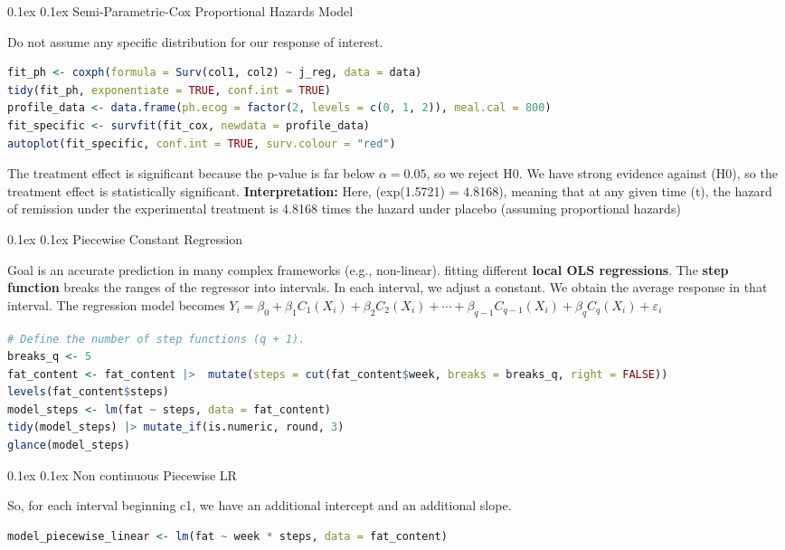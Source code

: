 \documentclass[8pt,landscape]{article}
\makeatletter
\renewcommand{\section}{\@startsection{section}{2}{0pt}%
    {0.1ex}%
    {0.1ex}%
    {\fontsize{8}{9}\bfseries\color{red}}} %
\renewcommand{\subsection}{\@startsection{subsection}{2}{0pt}%
    {0.1ex}%
    {0.1ex}%
    {\fontsize{8}{9}\bfseries\color{blue}}} %
\newcommand{\smalltext}[1]{
  {\fontsize{8}{9}\selectfont\sloppy #1\par}
}
\makeatother
\begin{document}
\begin{multicols}{3}
\subsection{Semi-Parametric-Cox Proportional Hazards Model}
\smalltext{
  Do not assume any specific distribution for our response of interest.
 }
\begin{lstlisting}[language=R]
fit_ph <- coxph(formula = Surv(col1, col2) ~ j_reg, data = data)
tidy(fit_ph, exponentiate = TRUE, conf.int = TRUE)
profile_data <- data.frame(ph.ecog = factor(2, levels = c(0, 1, 2)), meal.cal = 800)
fit_specific <- survfit(fit_cox, newdata = profile_data)
autoplot(fit_specific, conf.int = TRUE, surv.colour = "red")
\end{lstlisting}
\smalltext{
The treatment effect is significant because the p-value is far below $\alpha= 0.05$, so we reject H0.
We have strong evidence against (H0), so the treatment effect is statistically significant.
\textbf{Interpretation:} Here, (exp(1.5721) = 4.8168), meaning that at any given time (t), the hazard of remission under the experimental treatment is 4.8168 times
the hazard under placebo (assuming proportional hazards)
}

\section{Piecewise Constant Regression}
\smalltext{
  Goal is an accurate prediction in many complex frameworks (e.g., non-linear). fitting different \textbf{local OLS regressions}. The \textbf{step function}  
   breaks the ranges of the regressor into intervals. In each interval, we adjust a constant. We obtain the average response in that interval. The regression model becomes
   $Y_i = \beta_0 + \beta_1 C_1(X_i) + \beta_2 C_2(X_i) + \cdots + \beta_{q-1} C_{q-1}(X_i) + \beta_q C_q(X_i) + \varepsilon_i$
}
\begin{lstlisting}[language=R]
# Define the number of step functions (q + 1).
breaks_q <- 5
fat_content <- fat_content |>  mutate(steps = cut(fat_content$week, breaks = breaks_q, right = FALSE))
levels(fat_content$steps)
model_steps <- lm(fat ~ steps, data = fat_content)
tidy(model_steps) |> mutate_if(is.numeric, round, 3)
glance(model_steps)
\end{lstlisting}

\subsection{Non continuous Piecewise LR}
\smalltext{
  So, for each interval beginning c1, we have an additional intercept and an additional slope.
 }
\begin{lstlisting}[language=R]
model_piecewise_linear <- lm(fat ~ week * steps, data = fat_content)
\end{lstlisting}


\end{multicols}
\end{document}
